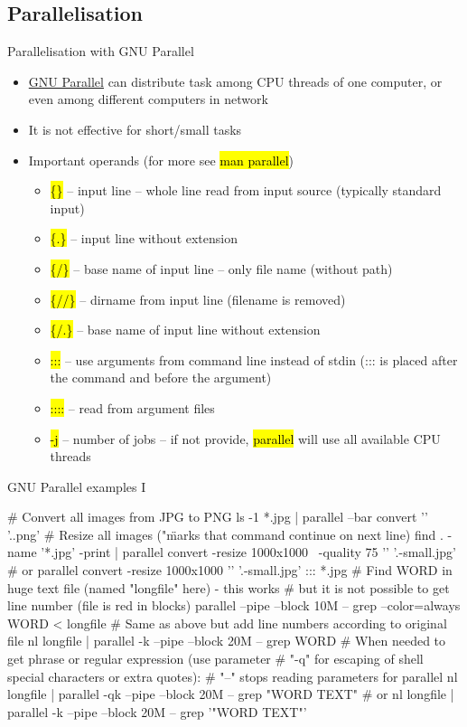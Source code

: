 \documentclass[compress, ucs, xelatex, 11pt, xcolor=svgnames,
  hyperref={
    bookmarks=true,
    unicode=true,
    colorlinks=true,
    pdftitle={Linux, command line and MetaCentrum},
    plainpages=false,
    pdfauthor={Vojtech Zeisek},
    pdfsubject={Course about use of Linux command line, writing shell scripts and using MetaCentrum of CESNET},
    pdfcreator={XeLaTeX},
    pdfkeywords={Linux, GNU, BASH, shell, command line, MetaCentrum},
    linkcolor=Red,
    anchorcolor=Blue,
    citecolor=Purple,
    filecolor=DodgerBlue,
    menucolor=DarkOrchid,
    urlcolor=DeepSkyBlue,
    pdftex},
  url={hyphens, lowtilde} %
  ]{beamer}
\renewcommand{\texttt}[1]{\hl{\ttfamily #1}}
\begin{document}
\subsection{Parallelisation}

\begin{frame}{Parallelisation with GNU Parallel}
\begin{itemize}
  \item \href{https://www.gnu.org/software/parallel/}{GNU Parallel} can distribute task among CPU threads of one computer, or even among different computers in network
  \item It is not effective for short/small tasks
  \item Important operands (for more see \texttt{man parallel})
  \begin{itemize}
    \item \texttt{\{\}} -- input line -- whole line read from input source (typically standard input)
    \item \texttt{\{.\}} -- input line without extension
    \item \texttt{\{/\}} -- base name of input line -- only file name (without path)
    \item \texttt{\{//\}} -- dirname from input line (filename is removed)
    \item \texttt{\{/.\}} -- base name of input line without extension
    \item \texttt{:::} -- use arguments from command line instead of stdin (::: is placed after the command and before the argument)
    \item \texttt{::::} -- read from argument files
    \item \texttt{-j} -- number of jobs -- if not provide, \texttt{parallel} will use all available CPU threads
  \end{itemize}
\end{itemize}
\end{frame}

\begin{frame}[fragile]{GNU Parallel examples I}
  \begin{bashcode}
    # Convert all images from JPG to PNG
    ls -1 *.jpg | parallel --bar convert '{}' '{.}.png'
    # Resize all images ("\" marks that command continue on next line)
    find . -name '*.jpg' -print | parallel convert -resize 1000x1000 \
      -quality 75 '{}' '{.}-small.jpg' # or
    parallel convert -resize 1000x1000 '{}' '{.}-small.jpg' ::: *.jpg
    # Find WORD in huge text file (named "longfile" here) - this works
    # but it is not possible to get line number (file is red in blocks)
    parallel --pipe --block 10M -- grep --color=always WORD < longfile
    # Same as above but add line numbers according to original file
    nl longfile | parallel -k --pipe --block 20M -- grep WORD
    # When needed to get phrase or regular expression (use parameter
    # "-q" for escaping of shell special characters or extra quotes):
    # "--" stops reading parameters for parallel
    nl longfile | parallel -qk --pipe --block 20M -- grep "WORD TEXT" # or
    nl longfile | parallel -k --pipe --block 20M -- grep '"WORD TEXT"'
  \end{bashcode}
\end{frame}
\end{document}
